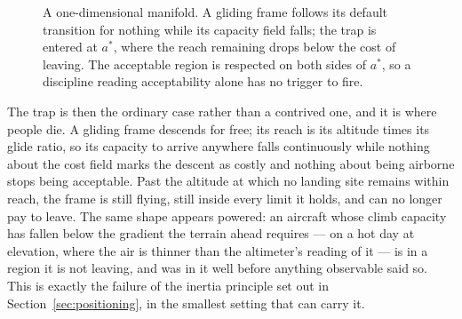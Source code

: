 \documentclass[11pt,a4paper]{article}
\theoremstyle{remark}
\newcommand{\Frame}{\mathcal F}
\begin{document}
\begin{figure}[htbp]
\centering
{}
\caption{A one-dimensional manifold. A gliding frame follows its default transition for nothing while its
capacity field falls; the trap is entered at $a^{*}$, where the reach remaining drops below the cost
of leaving. The acceptable region is respected on both sides of $a^{*}$, so a discipline reading
acceptability alone has no trigger to fire.}\label{fig:onedim}
\end{figure}

The trap is then the ordinary case rather than a contrived one, and it is where people die. A
gliding frame descends for free; its reach is its altitude times its glide ratio, so its capacity to
arrive anywhere falls continuously while nothing about the cost field marks the descent as costly
and nothing about being airborne stops being acceptable. Past the altitude at which no landing site
remains within reach, the frame is still flying, still inside every limit it holds, and can no longer
pay to leave. The same shape appears powered: an aircraft whose climb capacity has fallen below the
gradient the terrain ahead requires --- on a hot day at elevation, where the air is thinner than the
altimeter's reading of it --- is in a region it is not leaving, and was in it well before anything
observable said so. This is exactly the failure of the inertia principle set out in
Section~\ref{sec:positioning}, in the smallest setting that can carry it.
\end{document}
